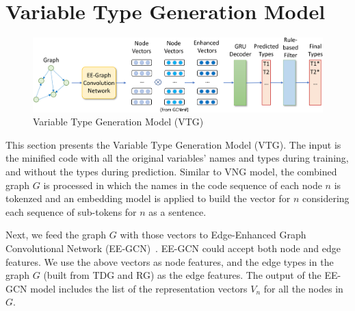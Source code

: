 \section{Variable Type Generation Model}
\label{sec:type-gen}

\begin{figure}[ht]
	\begin{center}
	  \includegraphics[width=4.8in]{figures/type-gen-model-2}
          \vspace{-6pt}
		\caption{Variable Type Generation Model (VTG)}
		\label{fig:type-gen}
	\end{center}
\end{figure}

This section presents the Variable Type Generation Model (VTG).  The
input is the minified code with all the original variables' names and
types during training, and without the types during
prediction. Similar to VNG model, the combined graph $G$ is processed
in which the names in the code sequence of each node $n$ is tokenzed
and an embedding model is applied to build the vector for $n$
considering each sequence of sub-tokens for $n$ as a sentence.


Next, we feed the graph $G$ with those vectors to Edge-Enhanced Graph
Convolutional Network (EE-GCN)~\cite{ee-gcn}. EE-GCN could accept both
node and edge features.  We use the above vectors as node features,
and the edge types in the graph $G$ (built from TDG and RG) as
the edge features.
%
{\color{blue}{The rationale for choosing EE-GCN is its capability
    producing the embeddings emphasizing on the edges in $G$, which
    represent the relations/dependencies among the data types.
%
A key characteristic of EE-GCN is that it has an edge-aware node
update module and a node-aware edge update module, and two modules
works in a mutual way by updating each other
iteratively. Specifically, ``for each layer, the edge-aware node
update module is firstly performed for aggregating information from
neighbors of each node through specific edges. Then, a node-aware edge
update module is used to dynamically refine the edge representation
with its connected node representations, making the edge
representation more informative.''}}  The output of the EE-GCN model
includes the list of the representation vectors $V_n$ for all the
nodes in $G$.


